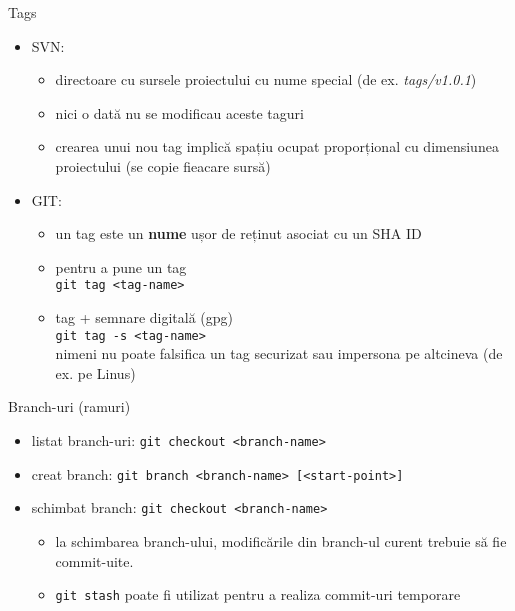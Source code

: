 \documentclass{beamer}
\begin{document}
\begin{frame}{Tags}
\begin{itemize}
\item SVN:
  \begin{itemize}
  \item directoare cu sursele proiectului cu nume special
    (de ex. \textit{tags/v1.0.1})
  \item nici o dată nu se modificau aceste taguri
  \item crearea unui nou tag implică spațiu ocupat proporțional cu 
    dimensiunea proiectului (se copie fieacare sursă)
  \end{itemize}
\item GIT:
  \begin{itemize}
  \item un tag este un \textbf{nume} ușor de reținut asociat cu un SHA ID
  \item pentru a pune un tag \\ 
    \texttt{git tag <tag-name>}
  \item tag + semnare digitală (gpg) \\ 
    \texttt{git tag -s <tag-name>}   \\
    nimeni nu poate falsifica un tag securizat sau impersona pe altcineva (de ex. pe Linus)
  \end{itemize}
\end{itemize}
\end{frame}


\begin{frame}{Branch-uri (ramuri)}
\begin{itemize} %
\item listat branch-uri: \texttt{git checkout <branch-name>}
\item creat branch: \texttt{git branch <branch-name> [<start-point>] }
\item schimbat branch: \texttt{git checkout <branch-name>}
\begin{itemize}
	\item la schimbarea branch-ului, modificările din branch-ul curent trebuie să fie commit-uite.
	\item \texttt{git stash} poate fi utilizat pentru a realiza commit-uri temporare
\end{itemize}
\end{itemize}
\end{frame}
\end{document}
